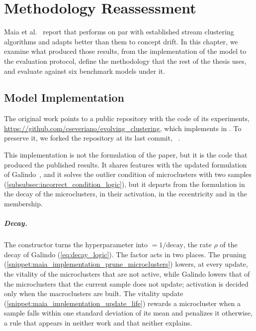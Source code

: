 \chapter{Methodology Reassessment}
\label{chap:methodology_reassessment}

Maia et al.~\cite{maia2020evolvclus} report that \MicroTEDAClus performs on par with established stream clustering algorithms and adapts better than them to concept drift. In this chapter, we examine what produced those results, from the implementation of the model to the evaluation protocol, define the methodology that the rest of the thesis uses, and evaluate \MicroTEDAClus against six benchmark models under it.

\section{Model Implementation}
\label{sec:model_implementation}

The original work points to a public repository with the code of its experiments, \url{https://github.com/cseveriano/evolving_clustering}, which implements \MicroTEDAClus in . To preserve it, we forked the repository at its last commit, ~\cite{eduardo2026evolvingclustering}.

This implementation is not the formulation of the paper, but it is the code that produced the published results. It shares features with the updated formulation of Galindo~\cite{galindo2021lastmile}, and it solves the outlier condition of microclusters with two samples (\cref{subsubsec:incorrect_condition_logic}), but it departs from the formulation in the decay of the microclusters, in their activation, in the eccentricity and in the membership.

\paragraph{Decay.} The constructor turns the hyperparameter  into  $= 1/\text{decay}$, the rate $\rho$ of the decay of Galindo (\cref{eq:decay_logic}). The factor acts in two places. The pruning (\cref{snippet:maia_implementation_prune_microclusters}) lowers, at every update, the vitality of the microclusters that are not active, while Galindo lowers that of the microclusters that the current sample does not update; activation is decided only when the macroclusters are built. The vitality update (\cref{snippet:maia_implementation_update_life}) rewards a microcluster when a sample falls within one standard deviation of its mean and penalizes it otherwise, a rule that appears in neither work and that neither explains.

